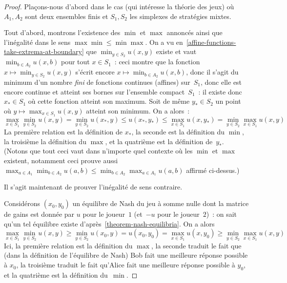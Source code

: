 \documentclass[12pt,a4paper]{article}
\theoremstyle{definition}
\begin{document}
\begin{proof}
Plaçons-nous d'abord dans le cas (qui intéresse la théorie des jeux)
où $A_1,A_2$ sont deux ensembles finis et $S_1,S_2$ les simplexes de
stratégies mixtes.

Tout d'abord, montrons l'existence des $\min$ et $\max$ annoncés ainsi
que l'inégalité dans le sens $\max\min \leq \min\max$.  On a vu
en \ref{affine-functions-take-extrema-at-boundary} que $\min_{y\in
  S_2} u(x,y)$ existe et vaut $\min_{b\in A_2} u(x,b)$ pour tout $x\in
S_1$ : ceci montre que la fonction $x \mapsto \min_{y\in S_2} u(x,y)$
s'écrit encore $x \mapsto \min_{b\in A_2} u(x,b)$, donc il s'agit du
minimum d'un nombre \emph{fini} de fonctions continues (affines)
sur $S_1$, donc elle est encore continue et atteint ses bornes sur
l'ensemble compact $S_1$ : il existe donc $x_* \in S_1$ où cette
fonction atteint son maximum.  Soit de même $y_* \in S_2$ un point où
$y \mapsto \max_{x\in S_1} u(x,y)$ atteint son minimum.  On a alors :
\[
\max_{x\in S_1} \min_{y\in S_2} u(x,y)
= \min_{y\in S_2} u(x_*,y)
\leq u(x_*,y_*) \leq \max_{x\in S_1} u(x,y_*) =
\min_{y\in S_2} \max_{x\in S_1} u(x,y)
\]
La première relation est la définition de $x_*$, la seconde est la
définition du $\min$, la troisième la définition du $\max$, et la
quatrième est la définition de $y_*$.  (Notons que tout ceci vaut dans
n'importe quel contexte où les $\min$ et $\max$ existent, notamment
ceci prouve aussi $\max_{a \in A_1} \min_{b\in A_2} u(a,b) \leq
\min_{b\in A_2} \max_{a \in A_1} u(a,b)$ affirmé ci-dessus.)

Il s'agit maintenant de prouver l'inégalité de sens contraire.

Considérons $(x_0,y_0)$ un équilibre de Nash du jeu à somme nulle dont
la matrice de gains est donnée par $u$ pour le joueur $1$ (et $-u$
pour le joueur $2$) : on sait qu'un tel équilibre existe
d'après \ref{theorem-nash-equilibria}.  On a alors
\[
\max_{x\in S_1} \min_{y\in S_2} u(x,y)
\geq \min_{y\in S_2} u(x_0,y) = u(x_0,y_0)
= \max_{x\in S_1} u(x,y_0) \geq
\min_{y\in S_2} \max_{x\in S_1} u(x,y)
\]
Ici, la première relation est la définition du $\max$, la seconde
traduit le fait que (dans la définition de l'équilibre de Nash) Bob
fait une meilleure réponse possible à $x_0$, la troisième traduit le
fait qu'Alice fait une meilleure réponse possible à $y_0$, et la
quatrième est la définition du $\min$.


\end{proof}
\end{document}
